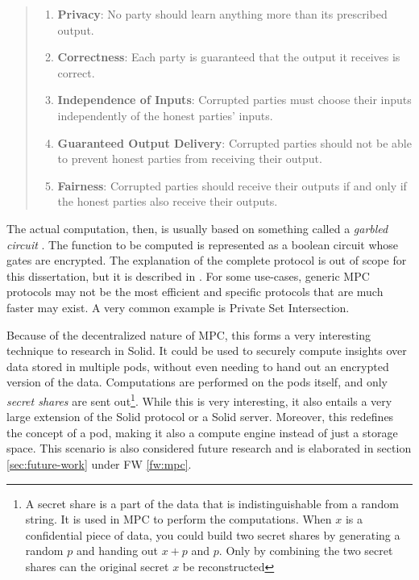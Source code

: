 \begin{quote}{\citet[p.2]{secure-mpc}}
\begin{enumerate}
    \item \textbf{Privacy}: No party should learn anything more than its prescribed output.
    \item \textbf{Correctness}: Each party is guaranteed that the output it receives is correct.
    \item \textbf{Independence of Inputs}: Corrupted parties must choose their inputs independently of the honest parties' inputs.
    \item \textbf{Guaranteed Output Delivery}: Corrupted parties should not be able to prevent honest parties from receiving their output.
    \item \textbf{Fairness}: Corrupted parties should receive their outputs if and only if the honest parties also receive their outputs.
\end{enumerate}
\end{quote}
The actual computation, then, is usually based on something called a \textit{garbled circuit} \citep{garbled-circuit}. The function to be computed is represented as a boolean circuit whose gates are encrypted. The explanation of the complete protocol is out of scope for this dissertation, but it is described in \citet{secure-mpc, pragmatic-mpc}. For some use-cases, generic \gls{MPC} protocols may not be the most efficient and specific protocols that are much faster may exist. A very common example is Private Set Intersection.

Because of the decentralized nature of \gls{MPC}, this forms a very interesting technique to research in Solid. It could be used to securely compute insights over data stored in multiple pods, without even needing to hand out an encrypted version of the data. Computations are performed on the pods itself, and only \textit{secret shares} are sent out\footnote{A secret share is a part of the data that is indistinguishable from a random string. It is used in \gls{MPC} to perform the computations. When $x$ is a confidential piece of data, you could build two secret shares by generating a random $p$ and handing out $x + p$ and $p$. Only by combining the two secret shares can the original secret $x$ be reconstructed}. While this is very interesting, it also entails a very large extension of the Solid protocol or a Solid server. Moreover, this redefines the concept of a pod, making it also a compute engine instead of just a storage space. This scenario is also considered future research and is elaborated in section \ref{sec:future-work} under FW \ref{fw:mpc}.


